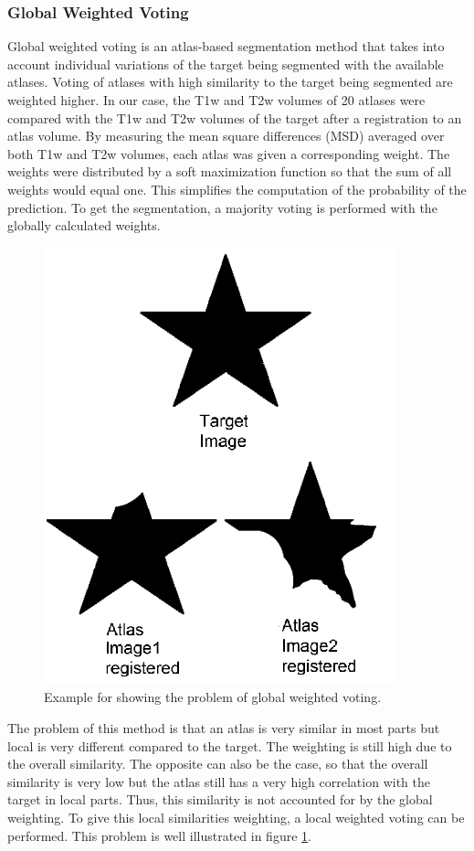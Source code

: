\subsubsection*{Global Weighted Voting}
Global weighted voting is an atlas-based segmentation method that takes into account individual variations of the target being segmented with the available atlases. Voting of atlases with high similarity to the target being segmented are weighted higher. In our case, the T1w and T2w volumes of 20 atlases were compared with the T1w and T2w volumes of the target after a registration to an atlas volume. By measuring the mean square differences (MSD) averaged over both T1w and T2w volumes, each atlas was given a corresponding weight.  The weights were distributed by a soft maximization function so that the sum of all weights would equal one. This simplifies the computation of the probability of the prediction. To get the segmentation, a majority voting is performed with the globally calculated weights.

\begin{figure}[h!]
	\centering
	\includegraphics[width=0.5\linewidth]{img/globalWeightedProblematic}
	\caption{Example for showing the problem of global weighted voting\cite{Artaechevarria2009}.}
	\label{fig:globalweightedproblematic}
\end{figure}

The problem of this method is that an atlas is very similar in most parts but local is very different compared to the target. The weighting is still high due to the overall similarity. The opposite can also be the case, so that the overall similarity is very low but the atlas still has a very high correlation with the target in local parts. Thus, this similarity is not accounted for by the global weighting. To give this local similarities weighting, a local weighted voting can be performed. This problem is well illustrated in figure \ref{fig:globalweightedproblematic}.


